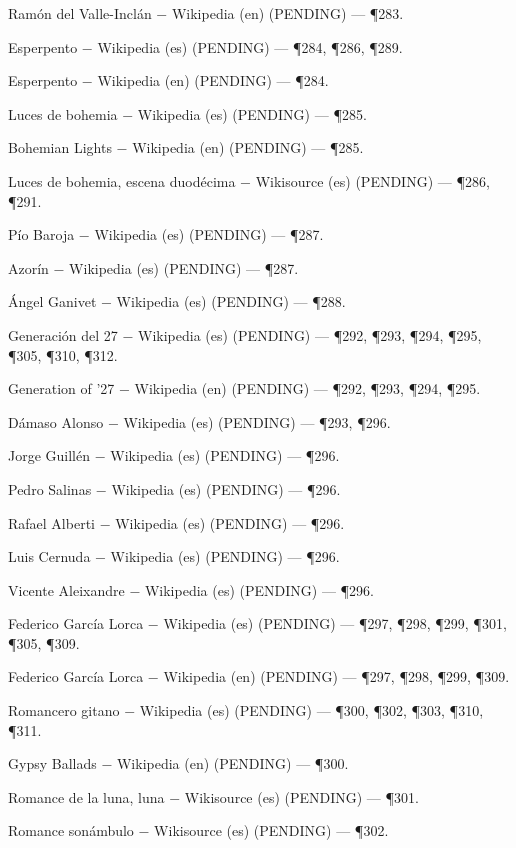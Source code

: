 \documentclass{book}
\begin{document}
\noindent Ramón del Valle-Inclán \(-\) Wikipedia (en) (PENDING) --- \P283.

\noindent Esperpento \(-\) Wikipedia (es) (PENDING) --- \P284, \P286, \P289.

\noindent Esperpento \(-\) Wikipedia (en) (PENDING) --- \P284.

\noindent Luces de bohemia \(-\) Wikipedia (es) (PENDING) --- \P285.

\noindent Bohemian Lights \(-\) Wikipedia (en) (PENDING) --- \P285.

\noindent Luces de bohemia, escena duodécima \(-\) Wikisource (es) (PENDING) --- \P286, \P291.

\noindent Pío Baroja \(-\) Wikipedia (es) (PENDING) --- \P287.

\noindent Azorín \(-\) Wikipedia (es) (PENDING) --- \P287.

\noindent Ángel Ganivet \(-\) Wikipedia (es) (PENDING) --- \P288.

\noindent Generación del 27 \(-\) Wikipedia (es) (PENDING) --- \P292, \P293, \P294, \P295, \P305, \P310, \P312.

\noindent Generation of '27 \(-\) Wikipedia (en) (PENDING) --- \P292, \P293, \P294, \P295.

\noindent Dámaso Alonso \(-\) Wikipedia (es) (PENDING) --- \P293, \P296.

\noindent Jorge Guillén \(-\) Wikipedia (es) (PENDING) --- \P296.

\noindent Pedro Salinas \(-\) Wikipedia (es) (PENDING) --- \P296.

\noindent Rafael Alberti \(-\) Wikipedia (es) (PENDING) --- \P296.

\noindent Luis Cernuda \(-\) Wikipedia (es) (PENDING) --- \P296.

\noindent Vicente Aleixandre \(-\) Wikipedia (es) (PENDING) --- \P296.

\noindent Federico García Lorca \(-\) Wikipedia (es) (PENDING) --- \P297, \P298, \P299, \P301, \P305, \P309.

\noindent Federico García Lorca \(-\) Wikipedia (en) (PENDING) --- \P297, \P298, \P299, \P309.

\noindent Romancero gitano \(-\) Wikipedia (es) (PENDING) --- \P300, \P302, \P303, \P310, \P311.

\noindent Gypsy Ballads \(-\) Wikipedia (en) (PENDING) --- \P300.

\noindent Romance de la luna, luna \(-\) Wikisource (es) (PENDING) --- \P301.

\noindent Romance sonámbulo \(-\) Wikisource (es) (PENDING) --- \P302.
\end{document}
